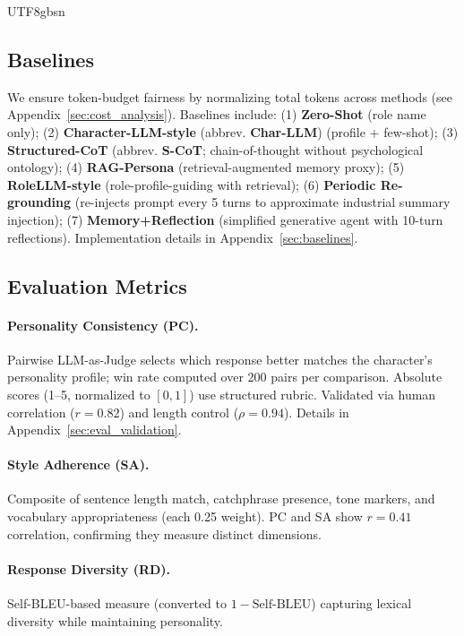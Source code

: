 \documentclass[11pt]{article}
\begin{document}
\begin{CJK*}{UTF8}{gbsn}
\subsection{Baselines}

We ensure token-budget fairness by normalizing total tokens across methods (see Appendix~\ref{sec:cost_analysis}). Baselines include: (1) \textbf{Zero-Shot} (role name only); (2) \textbf{Character-LLM-style} (abbrev. \textbf{Char-LLM}) \citep{shao2023character} (profile + few-shot); (3) \textbf{Structured-CoT} (abbrev. \textbf{S-CoT}; chain-of-thought without psychological ontology); (4) \textbf{RAG-Persona} (retrieval-augmented memory proxy); (5) \textbf{RoleLLM-style} \citep{wang2024rolellm} (role-profile-guiding with retrieval); (6) \textbf{Periodic Re-grounding} (re-injects prompt every 5 turns to approximate industrial summary injection); (7) \textbf{Memory+Reflection} (simplified generative agent with 10-turn reflections). Implementation details in Appendix~\ref{sec:baselines}.
\subsection{Evaluation Metrics}

\paragraph{Personality Consistency (PC).} Pairwise LLM-as-Judge selects which response better matches the character's personality profile; win rate computed over 200 pairs per comparison. Absolute scores (1--5, normalized to $[0,1]$) use structured rubric. Validated via human correlation ($r = 0.82$) and length control ($\rho=0.94$). Details in Appendix~\ref{sec:eval_validation}.

\paragraph{Style Adherence (SA).} Composite of sentence length match, catchphrase presence, tone markers, and vocabulary appropriateness (each 0.25 weight). PC and SA show $r=0.41$ correlation, confirming they measure distinct dimensions.

\paragraph{Response Diversity (RD).} Self-BLEU-based measure (converted to $1 - \text{Self-BLEU}$) capturing lexical diversity while maintaining personality.


\end{CJK*}
\end{document}
